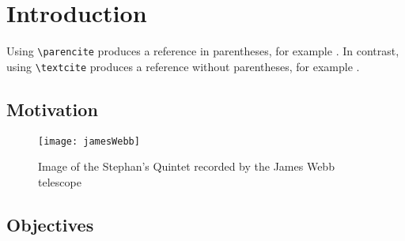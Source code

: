 \chapter{Introduction}%
\label{ch:introduction}%
Using \verb|\parencite| produces a reference in parentheses, for example \parencite{bishopPatternRecognitionMachine2006}. In contrast, using \verb|\textcite| produces a reference without parentheses, for example \textcite{rumelhartLearningRepresentationsBackpropagating1986}.

\lipsum%
%
\section{Motivation}%
\label{sec:motivation}%
\lipsum%
\begin{figure}
	\centering
	\texttt{[image: jamesWebb]}
	\caption[James Webb Stephan's Quintet]{Image of the Stephan's Quintet recorded by the James Webb telescope}
	\label{fig:jamesWebb}	
\end{figure}
%
\section{Objectives}%
\label{sec:objectives}%
\lipsum%
